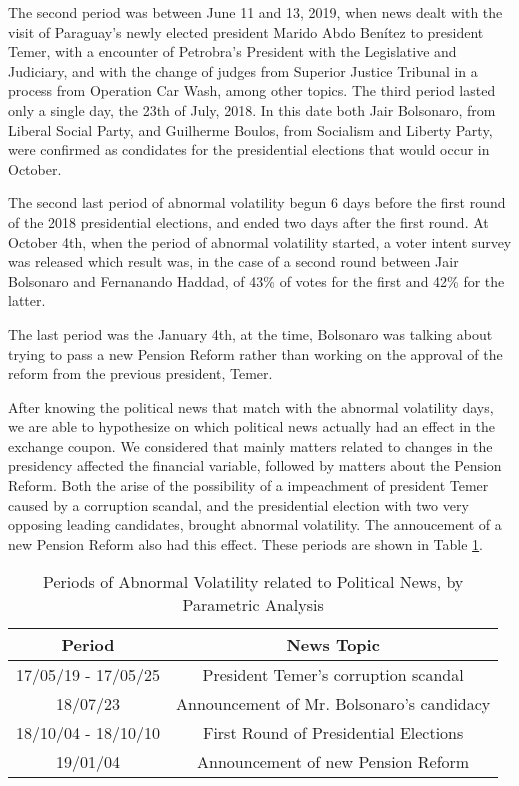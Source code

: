 \documentclass[cic,tc, english]{iiufrgs}
\begin{document}
    The second period was between June 11 and 13, 2019, when news dealt with the visit of Paraguay's newly elected president Marido Abdo Benítez to president Temer, with a encounter of Petrobra's President with the Legislative and Judiciary, and with the change of judges from Superior Justice Tribunal in a process from Operation Car Wash, among other topics. The third period lasted only a single day, the 23th of July, 2018. In this date both Jair Bolsonaro, from Liberal Social Party, and Guilherme Boulos, from Socialism and Liberty Party, were confirmed as condidates for the presidential elections that would occur in October.

    The second last period of abnormal volatility begun 6 days before the first round of the 2018 presidential elections, and ended two days after the first round. At October 4th, when the period of abnormal volatility started, a voter intent survey was released which result was, in the case of a second round between Jair Bolsonaro and Fernanando Haddad, of 43\% of votes for the first and 42\% for the latter.

    The last period was the January 4th, at the time, Bolsonaro was talking about trying to pass a new Pension Reform rather than working on the approval of the reform from the previous president, Temer.

    After knowing the political news that match with the abnormal volatility days, we are able to hypothesize on which political news actually had an effect in the exchange coupon. We considered that mainly matters related to changes in the presidency affected the financial variable, followed by matters about the Pension Reform. Both the arise of the possibility of a impeachment of president Temer caused by a corruption scandal, and the presidential election with two very opposing leading candidates, brought abnormal volatility. The annoucement of a new Pension Reform also had this effect. These periods are shown in Table \ref{tab:respar}.

    \begin{table}[H]
        \caption{Periods of Abnormal Volatility related to Political News, by Parametric Analysis}
        \label{tab:respar}
        \centering
        \begin{tabular}{| c | c |}
            \hline
            Period & News Topic \\
            \hline \hline
            17/05/19 - 17/05/25 & President Temer's corruption scandal \\
            \hline
            18/07/23 & Announcement of Mr. Bolsonaro's candidacy \\
            \hline
            18/10/04 - 18/10/10 & First Round of Presidential Elections \\
            \hline
            19/01/04 & Announcement of new Pension Reform \\
            \hline
        \end{tabular}
    \end{table}
\end{document}
